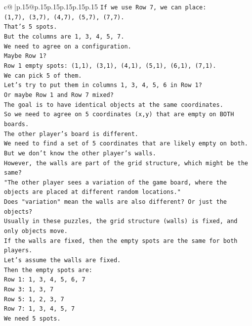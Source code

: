 \documentclass{article}
\begin{document}
{\begin{supertabular}{c@{$\;$}|p{.15\linewidth}@{}p{.15\linewidth}p{.15\linewidth}p{.15\linewidth}p{.15\linewidth}p{.15\linewidth}}
{{{\texttt{If we use Row 7, we can place:} \\
\texttt{(1,7), (3,7), (4,7), (5,7), (7,7).} \\
\texttt{That's 5 spots.} \\
\texttt{But the columns are 1, 3, 4, 5, 7.} \\
\texttt{We need to agree on a configuration.} \\
\texttt{Maybe Row 1?} \\
\texttt{Row 1 empty spots: (1,1), (3,1), (4,1), (5,1), (6,1), (7,1).} \\
\texttt{We can pick 5 of them.} \\
\texttt{Let's try to put them in columns 1, 3, 4, 5, 6 in Row 1?} \\
\texttt{Or maybe Row 1 and Row 7 mixed?} \\
\texttt{The goal is to have identical objects at the same coordinates.} \\
\texttt{So we need to agree on 5 coordinates (x,y) that are empty on BOTH boards.} \\
\texttt{The other player's board is different.} \\
\texttt{We need to find a set of 5 coordinates that are likely empty on both.} \\
\texttt{But we don't know the other player's walls.} \\
\texttt{However, the walls are part of the grid structure, which might be the same?} \\
\texttt{"The other player sees a variation of the game board, where the objects are placed at different random locations."} \\
\texttt{Does "variation" mean the walls are also different? Or just the objects?} \\
\texttt{Usually in these puzzles, the grid structure (walls) is fixed, and only objects move.} \\
\texttt{If the walls are fixed, then the empty spots are the same for both players.} \\
\texttt{Let's assume the walls are fixed.} \\
\texttt{Then the empty spots are:} \\
\texttt{Row 1: 1, 3, 4, 5, 6, 7} \\
\texttt{Row 3: 1, 3, 7} \\
\texttt{Row 5: 1, 2, 3, 7} \\
\texttt{Row 7: 1, 3, 4, 5, 7} \\
\texttt{We need 5 spots.} \\
}}}
\end{supertabular}}
\end{document}
